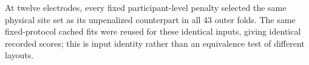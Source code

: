 At twelve electrodes, every fixed participant-level penalty selected the same physical site set as its unpenalized counterpart in all 43 outer folds. The same fixed-protocol cached fits were reused for these identical inputs, giving identical recorded scores; this is input identity rather than an equivalence test of different layouts.
